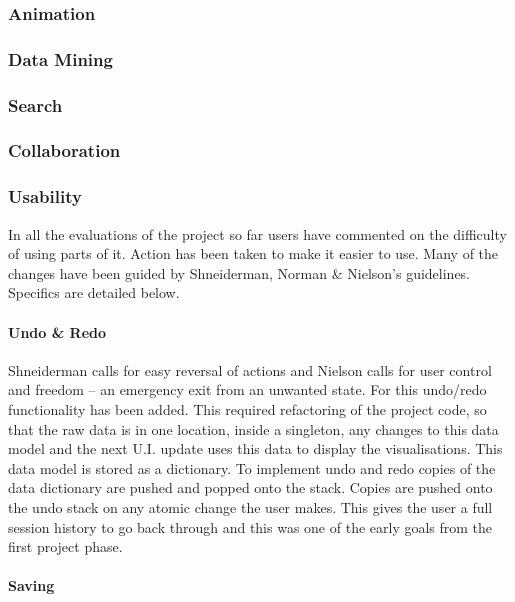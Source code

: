 \subsubsection{Animation}

\subsubsection{Data Mining}

\subsubsection{Search}

\subsubsection{Collaboration}

\subsubsection{Usability}

In all the evaluations of the project so far users have commented on the difficulty of using parts of it.  Action has been taken to make it easier to use.  Many of the changes have been guided by Shneiderman, Norman \& Nielson's guidelines.  Specifics are detailed below.

\paragraph{Undo \& Redo}
Shneiderman calls for easy reversal of actions and Nielson calls for user control and freedom -- an emergency exit from an unwanted state.  For this undo/redo functionality has been added.  This required refactoring of the project code, so that the raw data is in one location, inside a singleton, any changes to this data model and the next U.I. update uses this data to display the visualisations.  This data model is stored as a dictionary.  To implement undo and redo copies of the data dictionary are pushed and popped onto the stack.  Copies are pushed onto the undo stack on any atomic change the user makes.  This gives the user a full session history to go back through and this was one of the early goals from the first project phase.

\paragraph{Saving}

